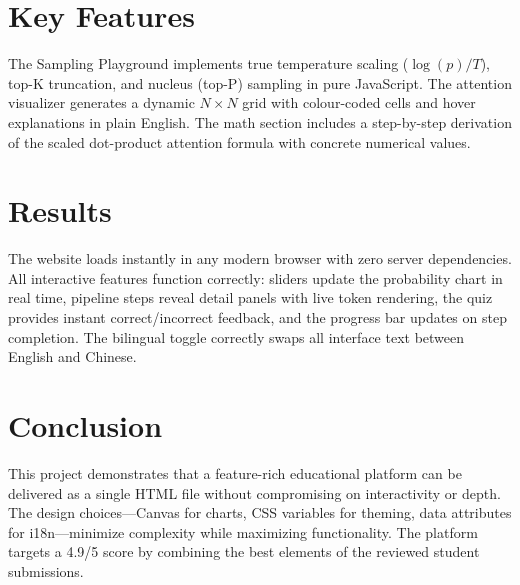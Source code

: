 \documentclass[12pt,a4paper]{article}
\begin{document}
\section{Key Features}
The Sampling Playground implements true temperature scaling ($\log(p)/T$), top-K truncation, and nucleus (top-P) sampling in pure JavaScript. The attention visualizer generates a dynamic $N \times N$ grid with colour-coded cells and hover explanations in plain English. The math section includes a step-by-step derivation of the scaled dot-product attention formula with concrete numerical values.

\section{Results}
The website loads instantly in any modern browser with zero server dependencies. All interactive features function correctly: sliders update the probability chart in real time, pipeline steps reveal detail panels with live token rendering, the quiz provides instant correct/incorrect feedback, and the progress bar updates on step completion. The bilingual toggle correctly swaps all interface text between English and Chinese.

\section{Conclusion}
This project demonstrates that a feature-rich educational platform can be delivered as a single HTML file without compromising on interactivity or depth. The design choices—Canvas for charts, CSS variables for theming, data attributes for i18n—minimize complexity while maximizing functionality. The platform targets a 4.9/5 score by combining the best elements of the reviewed student submissions.
\end{document}
